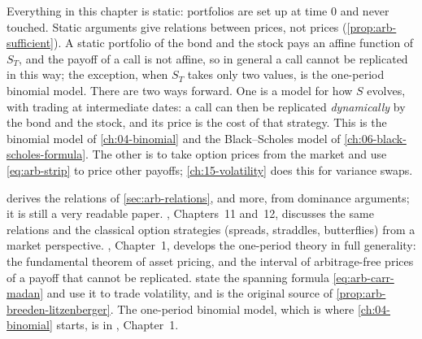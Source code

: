 \begin{remark}\label{rem:arb-model}
Everything in this chapter is static: portfolios are set up at time $0$ and never touched.
Static arguments give relations between prices, not prices (\cref{prop:arb-sufficient}).
A static portfolio of the bond and the stock pays an affine function of $S_T$, and the payoff
of a call is not affine, so in general a call cannot be replicated in this way; the exception,
when $S_T$ takes only two values, is the one-period binomial model. There are two ways
forward. One is a model for how $S$ evolves, with
trading at intermediate dates: a call can then be replicated \emph{dynamically} by the bond
and the stock, and its price is the cost of that strategy. This is the binomial model of
\cref{ch:04-binomial} and the Black--Scholes model of \cref{ch:06-black-scholes-formula}. The
other is to take option prices from the market and use \eqref{eq:arb-strip} to price other
payoffs; \cref{ch:15-volatility} does this for variance swaps.
\end{remark}

\furtherreading
\textcite{merton1973} derives the relations of \cref{sec:arb-relations}, and more, from
dominance arguments; it is still a very readable paper. \textcite{hull}, Chapters~11
and~12, discusses the same relations and the classical option strategies (spreads,
straddles, butterflies) from a market perspective. \textcite{follmer-schied}, Chapter~1,
develops the one-period theory in full generality: the fundamental theorem of asset pricing,
and the interval of arbitrage-free prices of a payoff that cannot be replicated.
\textcite{carr-madan} state the spanning formula \eqref{eq:arb-carr-madan} and use it to
trade volatility, and \textcite{breeden-litzenberger} is the original source of
\cref{prop:arb-breeden-litzenberger}. The one-period binomial model, which is where
\cref{ch:04-binomial} starts, is in \textcite{shreve1}, Chapter~1.
